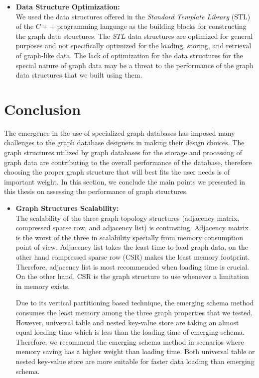 {\begin{itemize}
\item \textbf{Data Structure Optimization:}\\
We used the data structures offered in the \textit{Standard Template Library} (STL) of the $C++$ programming language as the building blocks for constructing the graph data structures. The $STL$ data structures are optimized for general purposes and not specifically optimized for the loading, storing, and retrieval of graph-like data. The lack of optimization for the data structures for the special nature of graph data may be a threat to the performance of the graph data structures that we built using them.


\end{itemize}

\section{Conclusion}
\label{sec:Conclusion}

The emergence in the use of specialized graph databases has imposed many challenges to the graph database designers in making their design choices. The graph structures utilized by graph databases for the storage and processing of graph data are contributing to the overall performance of the database, therefore choosing the proper graph structure that will best fits the user needs is of important weight. In this section, we conclude the main points we presented in this thesis on assessing the performance of graph structures.


\begin{itemize}  

\item \textbf{Graph Structures Scalability:}\\
The scalability of the three graph topology structures (adjacency matrix, compressed sparse row, and adjacency list) is contrasting. Adjacency matrix is the worst of the three in scalability specially from memory consumption point of view. Adjacency list takes the least time to load graph data, on the other hand compressed sparse row (CSR) makes the least memory footprint. Therefore, adjacency list is most recommended when loading time is crucial. On the other hand, CSR is the graph structure to use whenever a limitation in memory exists.

Due to its vertical partitioning based technique, the emerging schema method consumes the least memory among the three graph properties that we tested. However, universal table and nested key-value store are taking an almost equal loading time which is less than the loading time of emerging schema. Therefore, we recommend the emerging schema method in scenarios where memory saving has a higher weight than loading time. Both universal table or nested key-value store are more suitable for faster data loading than emerging schema.\\



\end{itemize}}
